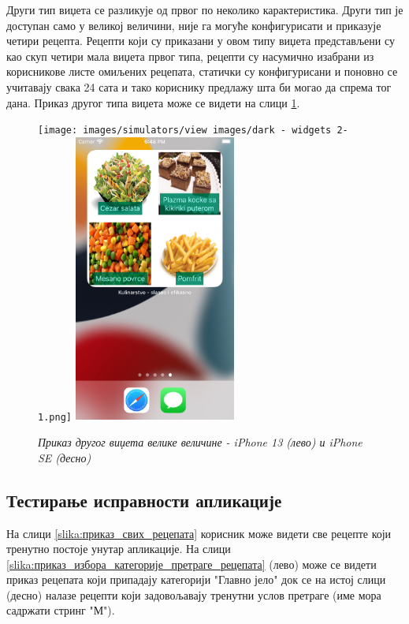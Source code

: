 \documentclass[12pt,oneside]{memoir}
\begin{document}
\indent Други тип виџета се разликује од првог по неколико карактеристика. Други тип је доступан само у великој величини, није га могуће конфигурисати и приказује четири рецепта. Рецепти који су приказани у овом типу виџета представљени су као скуп четири мала виџета првог типа, рецепти су насумично изабрани из корисникове листе омиљених рецепата, статички су конфигурисани и поновно се учитавају свака 24 сата и тако кориснику предлажу шта би могао да спрема тог дана. Приказ другог типа виџета може се видети на слици \ref{slika:приказ_виџета_3_1}.

\begin{figure} [H]
    \centering
    \captionsetup{justification=centering}
    \texttt{[image: images/simulators/view images/dark - widgets 2-1.png]} 
    \hfill
    \includegraphics[width=0.475\textwidth]{images/simulators/view images/light - widgets 2-1.png}
    \caption{\textit{Приказ другог виџета велике величине - iPhone 13 (лево) и iPhone SE (десно)}}
    \label{slika:приказ_виџета_3_1}
\end{figure}

\subsection{Тестирање исправности апликације}
\indent На слици \ref{slika:приказ_свих_рецепата} корисник може видети све рецепте који тренутно постоје унутар апликације. На слици \ref{slika:приказ_избора_категорије_претраге_рецепата} (лево) може се видети приказ рецепата који припадају категорији "Главно јело" док се на истој слици (десно) налазе рецепти који задовољавају тренутни услов претраге (име мора садржати стринг "М"). 
\end{document}
